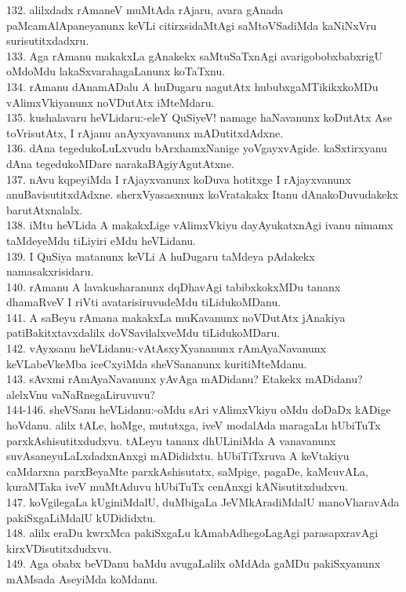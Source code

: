\documentclass{article}
\begin{document}
132. alilxdadx rAmaneV muMtAda rAjaru, avara gAnada paMcamAlApaneyanunx keVLi citirxsidaMtAgi saMtoVSadiMda kaNiNxVru surisutitxdadxru.\\
133. Aga rAmanu makakxLa gAnakekx saMtuSaTxnAgi avarigobobxbabxrigU oMdoMdu lakaSxvarahagaLanunx koTaTxnu.\\
134. rAmanu dAnamADalu A huDugaru nagutAtx hububxgaMTikikxkoMDu vAlimxVkiyanunx noVDutAtx iMteMdaru.\\
135. kushalavaru heVLidaru:-eleY QuSiyeV! namage haNavanunx koDutAtx Ase toVrisutAtx, I rAjanu anAyxyavanunx mADutitxdAdxne.\\
136. dAna tegedukoLuLxvudu bArxhamxNanige yoVgayxvAgide. kaSxtirxyanu dAna tegedukoMDare narakaBAgiyAgutAtxne.\\
137. nAvu kqpeyiMda I rAjayxvanunx koDuva hotitxge I rAjayxvanunx anuBavisutitxdAdxne. sherxVyasasxnunx koVratakakx Itanu dAnakoDuvudakekx barutAtxnalalx.\\
138. iMtu heVLida A makakxLige vAlimxVkiyu dayAyukatxnAgi ivanu nimamx taMdeyeMdu tiLiyiri eMdu heVLidanu.\\
139. I QuSiya matanunx keVLi A huDugaru taMdeya pAdakekx namasakxrisidaru.\\
140. rAmanu A lavakusharanunx dqDhavAgi tabibxkokxMDu tananx dhamaRveV I riVti avatarisiruvudeMdu tiLidukoMDanu.\\
141. A saBeyu rAmana makakxLa muKavanunx noVDutAtx jAnakiya patiBakitxtavxdalilx doVSavilalxveMdu tiLidukoMDaru.\\
142. vAyxsanu heVLidanu:-vAtAsxyXyananunx rAmAyaNavanunx keVLabeVkeMba iceCxyiMda sheVSananunx kuritiMteMdanu.\\
143. sAvxmi rAmAyaNavanunx yAvAga mADidanu? Etakekx mADidanu? alelxVnu vaNaRnegaLiruvuvu?\\
144-146. sheVSanu heVLidanu:-oMdu sAri vAlimxVkiyu oMdu doDaDx kADige hoVdanu. alilx tALe, hoMge, mututxga, iveV modalAda maragaLu hUbiTuTx parxkAshisutitxdudxvu. tALeyu tananx dhULiniMda A vanavanunx suvAsaneyuLaLxdadxnAnxgi mADididxtu. hUbiTiTxruva A keVtakiyu caMdarxna parxBeyaMte parxkAshisutatx, saMpige, pagaDe, kaMcuvALa, kuraMTaka iveV muMtAduvu hUbiTuTx cenAnxgi kANisutitxdudxvu.\\
147. koVgilegaLa kUginiMdalU, duMbigaLa JeVMkAradiMdalU manoVharavAda pakiSxgaLiMdalU kUDididxtu.\\
148. alilx eraDu kwrxMca pakiSxgaLu kAmabAdhegoLagAgi parasapxravAgi kirxVDisutitxdudxvu.\\
149. Aga obabx beVDanu baMdu avugaLalilx oMdAda gaMDu pakiSxyanunx mAMsada AseyiMda koMdanu.\\
\end{document}
